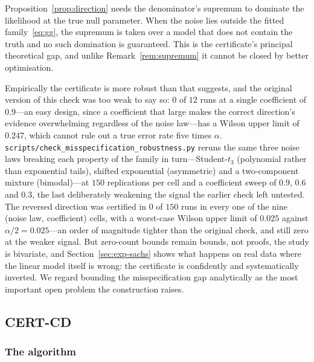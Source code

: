 \begin{remark}
\label{rem:misspec}
Proposition~\ref{prop:direction} needs the denominator's supremum to dominate
the likelihood at the true null parameter. When the noise lies outside the
fitted family~\eqref{eq:gg}, the supremum is taken over a model that does not
contain the truth and no such domination is guaranteed. This is the
certificate's principal theoretical gap, and unlike Remark~\ref{rem:supremum}
it cannot be closed by better optimisation.

Empirically the certificate is more robust than that suggests, and the
original version of this check was too weak to say so: $0$ of $12$ runs at a
single coefficient of $0.9$---an easy design, since a coefficient that large
makes the correct direction's evidence overwhelming regardless of the noise
law---has a Wilson upper limit of $0.247$, which cannot rule out a true
error rate five times $\alpha$.
\texttt{scripts/check\_misspecification\_robustness.py} reruns the same three
noise laws breaking each property of the family in turn---Student-$t_3$
(polynomial rather than exponential tails), shifted exponential (asymmetric)
and a two-component mixture (bimodal)---at $150$ replications per cell and a
coefficient sweep of $0.9$, $0.6$ and $0.3$, the last deliberately weakening
the signal the earlier check left untested. The reversed direction was
certified in $0$ of $150$ runs in every one of the nine (noise law,
coefficient) cells, with a worst-case Wilson upper limit of $0.025$ against
$\alpha/2 = 0.025$---an order of magnitude tighter than the original check,
and still zero at the weaker signal. But zero-count bounds remain bounds, not
proofs, the study is bivariate, and Section~\ref{sec:exp-sachs} shows what
happens on real data where the linear model itself is wrong: the certificate
is confidently and systematically inverted. We regard bounding the
misspecification gap analytically as the most important open problem the
construction raises.
\end{remark}

\subsection{CERT-CD}\label{sec:algorithm}

\subsubsection{The algorithm}\label{sec:algo-desc}

